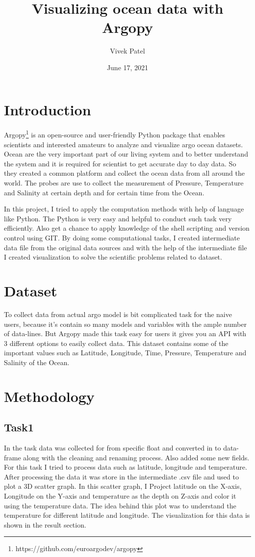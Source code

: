 \documentclass[12pt, letterpaper]{article}
\title{Visualizing ocean data with Argopy}
\author{Vivek Patel}
\date{June 17, 2021}
\begin{document}
\maketitle

\section{Introduction}
Argopy\footnote{https://github.com/euroargodev/argopy} is an open-source and user-friendly Python package that enables scientists and interested amateurs to analyze and visualize argo ocean datasets.
Ocean are the very important part of our living system and to better understand the system and it is required for scientist to get accurate day to day data. So they created a common platform and collect the ocean data from all around the world. The probes are use to collect the measurement of Pressure, Temperature and Salinity at certain depth and for certain time from the Ocean.

In this project, I tried to apply the computation methods with help of language like Python. The Python is very easy and helpful to conduct such task very efficiently. Also get a chance to apply knowledge of the shell scripting and version control using GIT. By doing some computational tasks, I created intermediate data file from the original data sources and with the help of the intermediate file I created visualization to solve the scientific problems related to dataset.  


\section{Dataset}


To collect data from actual argo model is bit complicated task for the naive users, because it's contain so many models and variables with the ample number of data-lines. But Argopy made this task easy for users it gives you an API with 3 different options to easily collect data. This dataset contains some of the important values such as Latitude, Longitude, Time, Pressure, Temperature and Salinity of the Ocean.




\section{Methodology}


\subsection{Task1}
In the task data was collected for from specific float and converted in to data-frame along with the cleaning and renaming process. Also added some new fields. For this task I tried to process data such as latitude, longitude and temperature. After processing the data it was store in the intermediate .csv file and used to plot a 3D scatter graph. In this scatter graph, I Project latitude on the X-axis, Longitude on the Y-axis and temperature as the depth on Z-axis and color it using the temperature data. The idea behind this plot was to understand the temperature for different latitude and longitude. The visualization for this data is shown in the result section. 
\end{document}

